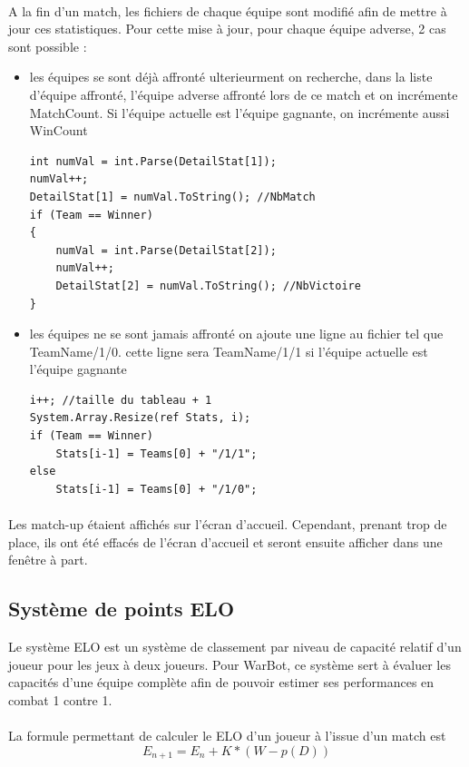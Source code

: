 \documentclass{report}
\begin{document}
\paragraph{}
A la fin d'un match, les fichiers de chaque équipe sont modifié afin de mettre à jour ces statistiques. \newline
Pour cette mise à jour, pour chaque équipe adverse, 2 cas sont possible :
\newline
\begin{itemize}
\item
les équipes se sont déjà affronté ulterieurment
on recherche, dans la liste d'équipe affronté, l'équipe adverse affronté lors de ce match et on incrémente MatchCount. Si l'équipe actuelle est l'équipe gagnante, on incrémente aussi WinCount
\begin{lstlisting}[frame=single]
int numVal = int.Parse(DetailStat[1]);
numVal++;
DetailStat[1] = numVal.ToString(); //NbMatch
if (Team == Winner)
{
    numVal = int.Parse(DetailStat[2]);
    numVal++;
    DetailStat[2] = numVal.ToString(); //NbVictoire
}
\end{lstlisting}
\item
les équipes ne se sont jamais affronté
on ajoute une ligne au fichier tel que TeamName/1/0. cette ligne sera TeamName/1/1 si l'équipe actuelle est l'équipe gagnante
\begin{lstlisting}[frame=single]
i++; //taille du tableau + 1
System.Array.Resize(ref Stats, i);
if (Team == Winner) 
    Stats[i-1] = Teams[0] + "/1/1";
else 
    Stats[i-1] = Teams[0] + "/1/0";
\end{lstlisting}
\paragraph{}
\end{itemize}
Les match-up étaient affichés sur l'écran d'accueil. Cependant, prenant trop de place, ils ont été effacés de l'écran d'accueil et seront ensuite afficher dans une fenêtre à part.


\subsection{Système de points ELO}

Le système ELO est un système de classement par niveau de capacité relatif d'un joueur pour les jeux à deux joueurs. Pour WarBot, ce système sert à évaluer les capacités d'une équipe complète afin de pouvoir estimer ses performances en combat 1 contre 1. 
\paragraph{}
La formule permettant de calculer le ELO d'un joueur à l'issue d'un match est 
\[
E_{n+1} = E_n + K * (W - p(D))
\]
\end{document}
